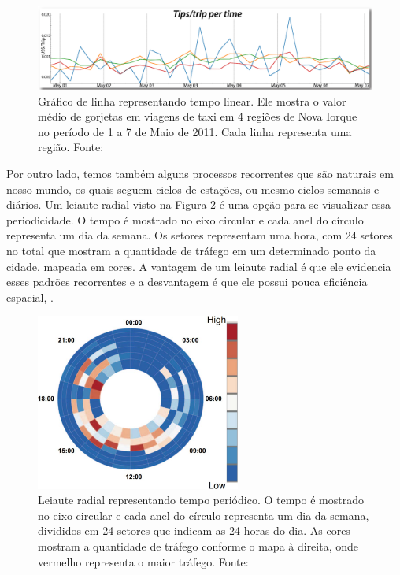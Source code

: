 \begin{figure}[!htb]
  \centering
  \includegraphics[width=\textwidth]{../figuras/linear-time.png}
  \caption[Gráfico de linha representando tempo linear]{Gráfico de linha representando tempo linear. 
Ele mostra o valor médio de gorjetas em viagens de taxi em 4 regiões de Nova Iorque no período de 1 a 7 de Maio de 2011.
Cada linha representa uma região. Fonte: \citep{Ferreira2013}
  \label{fig:linear-time}}
\end{figure}

Por outro lado, temos também alguns processos recorrentes que são naturais em nosso
mundo, os quais seguem ciclos de estações, ou mesmo ciclos semanais e diários. Um leiaute
radial visto na Figura \ref{fig:periodic-time} é uma opção para se visualizar essa periodicidade. O tempo é
mostrado no eixo circular e cada anel do círculo representa um dia da semana. Os setores
representam uma hora, com 24 setores no total que mostram a quantidade de tráfego em
um determinado ponto da cidade, mapeada em cores. A vantagem de um leiaute radial
é que ele evidencia esses padrões recorrentes e a desvantagem é que ele possui pouca
eficiência espacial, \citep{Chen2015}.

\begin{figure}[!htb]
  \centering
  \includegraphics[width=0.6\textwidth]{../figuras/periodic-time.png}
  \caption[Leiaute radial representando tempo periódico]{Leiaute radial
representando tempo periódico. O tempo é mostrado no eixo circular e cada anel
do círculo representa um dia da semana, divididos em 24 setores que indicam as
24 horas do dia. As cores mostram a quantidade de tráfego conforme o mapa à
direita, onde vermelho representa o maior tráfego. Fonte: \citet{Pu2013} \label{fig:periodic-time}}
\end{figure}

